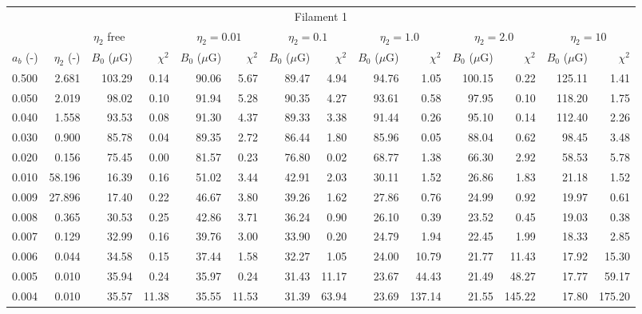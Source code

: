 \begin{tabular}{@{}lrrrrrrrrrrrrr@{}}
\toprule
\multicolumn{14}{c}{Filament 1} \\
\cmidrule{1-14}
{} & \multicolumn{3}{c}{$\eta_2$ free} & \multicolumn{2}{c}{$\eta_2 = 0.01$}
   & \multicolumn{2}{c}{$\eta_2 = 0.1$} & \multicolumn{2}{c}{$\eta_2 = 1.0$}
   & \multicolumn{2}{c}{$\eta_2 = 2.0$} & \multicolumn{2}{c}{$\eta_2 = 10$} \\
\cmidrule(lr){2-4} \cmidrule(lr){5-6} \cmidrule(lr){7-8} \cmidrule(lr){9-10}
    \cmidrule(lr){11-12} \cmidrule(lr){13-14}
$a_b$ (-) & $\eta_2$ (-) & $B_0$ ($\mu$G) & $\chi^2$
& $B_0$ ($\mu$G) & $\chi^2$ & $B_0$ ($\mu$G) & $\chi^2$
& $B_0$ ($\mu$G) & $\chi^2$ & $B_0$ ($\mu$G) & $\chi^2$
& $B_0$ ($\mu$G) & $\chi^2$ \\
\cmidrule{1-14}
0.500 & 2.681 & 103.29 & 0.14 & 90.06 & 5.67 & 89.47 & 4.94 & 94.76 & 1.05 & 100.15 & 0.22 & 125.11 & 1.41 \\
0.050 & 2.019 & 98.02 & 0.10 & 91.94 & 5.28 & 90.35 & 4.27 & 93.61 & 0.58 & 97.95 & 0.10 & 118.20 & 1.75 \\
0.040 & 1.558 & 93.53 & 0.08 & 91.30 & 4.37 & 89.33 & 3.38 & 91.44 & 0.26 & 95.10 & 0.14 & 112.40 & 2.26 \\
0.030 & 0.900 & 85.78 & 0.04 & 89.35 & 2.72 & 86.44 & 1.80 & 85.96 & 0.05 & 88.04 & 0.62 & 98.45 & 3.48 \\
0.020 & 0.156 & 75.45 & 0.00 & 81.57 & 0.23 & 76.80 & 0.02 & 68.77 & 1.38 & 66.30 & 2.92 & 58.53 & 5.78 \\
0.010 & 58.196 & 16.39 & 0.16 & 51.02 & 3.44 & 42.91 & 2.03 & 30.11 & 1.52 & 26.86 & 1.83 & 21.18 & 1.52 \\
0.009 & 27.896 & 17.40 & 0.22 & 46.67 & 3.80 & 39.26 & 1.62 & 27.86 & 0.76 & 24.99 & 0.92 & 19.97 & 0.61 \\
0.008 & 0.365 & 30.53 & 0.25 & 42.86 & 3.71 & 36.24 & 0.90 & 26.10 & 0.39 & 23.52 & 0.45 & 19.03 & 0.38 \\
0.007 & 0.129 & 32.99 & 0.16 & 39.76 & 3.00 & 33.90 & 0.20 & 24.79 & 1.94 & 22.45 & 1.99 & 18.33 & 2.85 \\
0.006 & 0.044 & 34.58 & 0.15 & 37.44 & 1.58 & 32.27 & 1.05 & 24.00 & 10.79 & 21.77 & 11.43 & 17.92 & 15.30 \\
0.005 & 0.010 & 35.94 & 0.24 & 35.97 & 0.24 & 31.43 & 11.17 & 23.67 & 44.43 & 21.49 & 48.27 & 17.77 & 59.17 \\
0.004 & 0.010 & 35.57 & 11.38 & 35.55 & 11.53 & 31.39 & 63.94 & 23.69 & 137.14 & 21.55 & 145.22 & 17.80 & 175.20 \\


\end{tabular}
